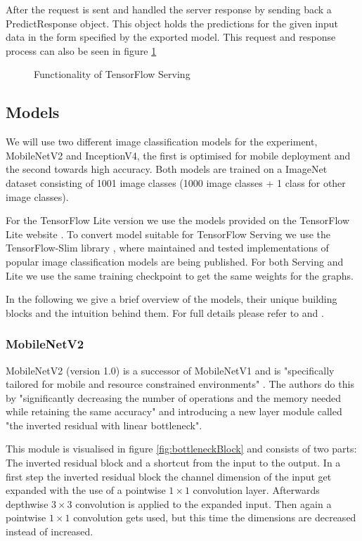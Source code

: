 After the request is sent and handled the server response by sending back a PredictResponse object. This object holds the predictions for the given input data in the form specified by the exported model.
This request and response process can also be seen in figure \ref{fig:cloud}

\begin{figure}[H]
\centering

\caption{Functionality of TensorFlow Serving}
\label{fig:cloud}
\end{figure}
\subsection{Models}
\label{chap:models}
We will use two different image classification models for the experiment, MobileNetV2 and InceptionV4, the first is optimised for mobile deployment and the second towards high accuracy.
Both models are trained on a ImageNet dataset consisting of 1001 image classes (1000 image classes + 1 class for other image classes).

For the TensorFlow Lite version we use the models provided on the TensorFlow Lite website \cite{tfLiteModels}.
To convert model suitable for TensorFlow Serving we use the TensorFlow-Slim library \cite{tfSlim}, where maintained and tested implementations of popular image classification models are being published. For both Serving and Lite we use the same training checkpoint to get the same weights for the graphs.

In the following we give a brief overview of the models, their unique building blocks and the intuition behind them.
For full details please refer to \cite{DBLP:journals/corr/abs-1801-04381} and \cite{InceptionV4}.

\subsubsection{MobileNetV2}
MobileNetV2 (version 1.0) is a successor of MobileNetV1 and is "specifically tailored for mobile and resource
constrained environments" \cite{DBLP:journals/corr/abs-1801-04381}. The authors do this by "significantly decreasing the number of operations and the memory needed while retaining the same accuracy"  \cite{DBLP:journals/corr/abs-1801-04381} and introducing a new layer module called "the
inverted residual with linear bottleneck".

This module is visualised in figure \ref{fig:bottleneckBlock} and consists of two parts: The inverted residual block and a shortcut from the input to the output.
In a first step the inverted residual block the channel dimension of the input get expanded with the use of a pointwise $1\times1$ convolution layer. 
Afterwards depthwise $3\times3$ convolution is applied to the expanded input. Then again a pointwise $1\times1$ convolution gets used, but this time the dimensions are decreased instead of increased.

